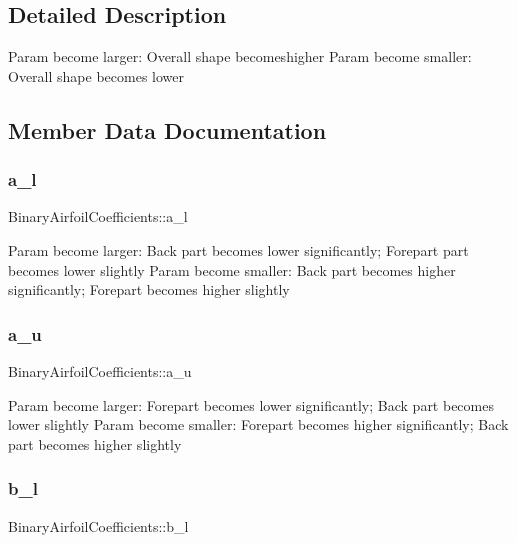\subsection{Detailed Description}
Param become larger\+: Overall shape becomeshigher Param become smaller\+: Overall shape becomes lower 

\subsection{Member Data Documentation}
\hypertarget{struct_binary_airfoil_coefficients_a49511b7e8398b06d8d880c7576ab5311}{}\label{struct_binary_airfoil_coefficients_a49511b7e8398b06d8d880c7576ab5311} 
\subsubsection{\texorpdfstring{a\+\_\+l}{a\_l}}
{\footnotesize\ttfamily Binary\+Airfoil\+Coefficients\+::a\+\_\+l}

Param become larger\+: Back part becomes lower significantly; Forepart part becomes lower slightly Param become smaller\+: Back part becomes higher significantly; Forepart becomes higher slightly \hypertarget{struct_binary_airfoil_coefficients_a2fd01b5ce7c9bef55ba5e30bd19c062a}{}\label{struct_binary_airfoil_coefficients_a2fd01b5ce7c9bef55ba5e30bd19c062a} 
\subsubsection{\texorpdfstring{a\+\_\+u}{a\_u}}
{\footnotesize\ttfamily Binary\+Airfoil\+Coefficients\+::a\+\_\+u}

Param become larger\+: Forepart becomes lower significantly; Back part becomes lower slightly Param become smaller\+: Forepart becomes higher significantly; Back part becomes higher slightly \hypertarget{struct_binary_airfoil_coefficients_a3d553603f76f7b5ddc6febc3a70db3f3}{}\label{struct_binary_airfoil_coefficients_a3d553603f76f7b5ddc6febc3a70db3f3} 
\subsubsection{\texorpdfstring{b\+\_\+l}{b\_l}}
{\footnotesize\ttfamily Binary\+Airfoil\+Coefficients\+::b\+\_\+l}

